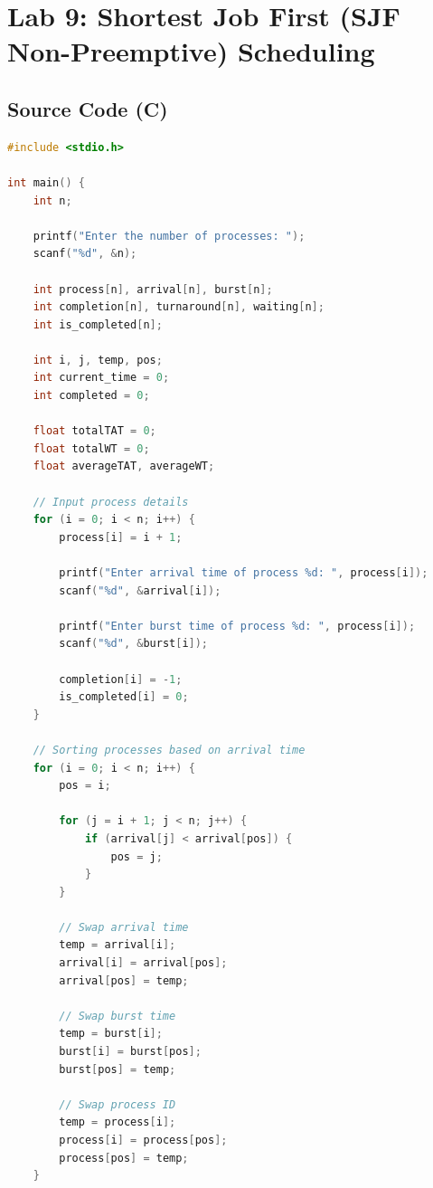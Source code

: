 \documentclass[10pt,a4paper]{article}
\begin{document}
\newpage

\section{Lab 9: Shortest Job First (SJF Non-Preemptive) Scheduling}

\subsection{Source Code (C)}
\begin{lstlisting}[language=C]
#include <stdio.h>

int main() {
    int n;

    printf("Enter the number of processes: ");
    scanf("%d", &n);

    int process[n], arrival[n], burst[n];
    int completion[n], turnaround[n], waiting[n];
    int is_completed[n];

    int i, j, temp, pos;
    int current_time = 0;
    int completed = 0;

    float totalTAT = 0;
    float totalWT = 0;
    float averageTAT, averageWT;

    // Input process details
    for (i = 0; i < n; i++) {
        process[i] = i + 1;

        printf("Enter arrival time of process %d: ", process[i]);
        scanf("%d", &arrival[i]);

        printf("Enter burst time of process %d: ", process[i]);
        scanf("%d", &burst[i]);

        completion[i] = -1;
        is_completed[i] = 0;
    }

    // Sorting processes based on arrival time
    for (i = 0; i < n; i++) {
        pos = i;

        for (j = i + 1; j < n; j++) {
            if (arrival[j] < arrival[pos]) {
                pos = j;
            }
        }

        // Swap arrival time
        temp = arrival[i];
        arrival[i] = arrival[pos];
        arrival[pos] = temp;

        // Swap burst time
        temp = burst[i];
        burst[i] = burst[pos];
        burst[pos] = temp;

        // Swap process ID
        temp = process[i];
        process[i] = process[pos];
        process[pos] = temp;
    }


\end{lstlisting}
\end{document}
